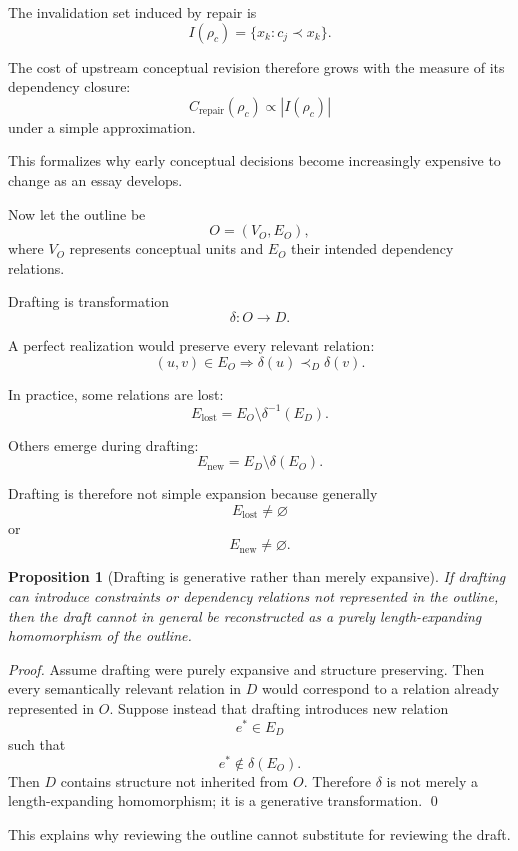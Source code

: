 \documentclass[11pt]{article}
\newtheorem{proposition}[definition]{Proposition}
\begin{document}
The invalidation set induced by repair is
\[
    I(\rho_c)
    =
    \{
        x_k:
        c_j\prec x_k
    \}.
\]

The cost of upstream conceptual revision therefore grows with the measure of its dependency closure:
\[
    C_{\mathrm{repair}}(\rho_c)
    \propto
    |I(\rho_c)|
\]
under a simple approximation.

This formalizes why early conceptual decisions become increasingly expensive to change as an essay develops.

Now let the outline be
\[
    O
    =
    (V_O,E_O),
\]
where \(V_O\) represents conceptual units and \(E_O\) their intended dependency relations.

Drafting is transformation
\[
    \delta:
    O\rightarrow D.
\]

A perfect realization would preserve every relevant relation:
\[
    (u,v)\in E_O
    \Rightarrow
    \delta(u)\prec_D\delta(v).
\]

In practice, some relations are lost:
\[
    E_{\mathrm{lost}}
    =
    E_O
    \setminus
    \delta^{-1}(E_D).
\]

Others emerge during drafting:
\[
    E_{\mathrm{new}}
    =
    E_D
    \setminus
    \delta(E_O).
\]

Drafting is therefore not simple expansion because generally
\[
    E_{\mathrm{lost}}\neq\varnothing
\]
or
\[
    E_{\mathrm{new}}\neq\varnothing.
\]

\begin{proposition}[Drafting is generative rather than merely expansive]
If drafting can introduce constraints or dependency relations not represented in the outline, then the draft cannot in general be reconstructed as a purely length-expanding homomorphism of the outline.
\end{proposition}

\begin{proof}
Assume drafting were purely expansive and structure preserving. Then every semantically relevant relation in \(D\) would correspond to a relation already represented in \(O\). Suppose instead that drafting introduces new relation
\[
    e^\ast\in E_D
\]
such that
\[
    e^\ast\notin\delta(E_O).
\]
Then \(D\) contains structure not inherited from \(O\). Therefore \(\delta\) is not merely a length-expanding homomorphism; it is a generative transformation. \qed
\end{proof}

This explains why reviewing the outline cannot substitute for reviewing the draft.
\end{document}
